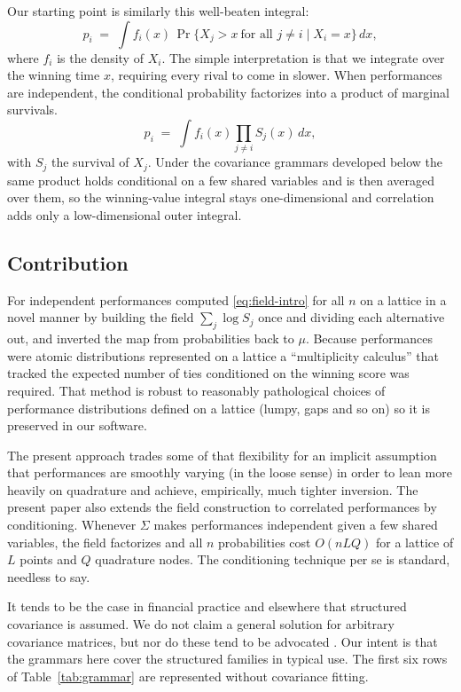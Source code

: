\documentclass[11pt]{article}
\begin{document}
Our starting point is similarly this well-beaten integral:
\begin{equation}\label{eq:onedim}
p_i \;=\; \int f_i(x)\,
\Pr\{X_j>x\ \text{for all } j\ne i\mid X_i=x\}\,dx,
\end{equation}
where $f_i$ is the density of $X_i$. The simple interpretation is that we integrate over the winning time $x$,
requiring every rival to come in slower. When performances are
independent, the conditional probability factorizes into a product of
marginal survivals.
\begin{equation}\label{eq:field-intro}
p_i \;=\; \int f_i(x)\prod_{j\ne i}S_j(x)\,dx,
\end{equation}
with $S_j$ the survival of $X_j$. Under the covariance grammars developed
below the same product holds conditional on a few shared variables and is
then averaged over them, so the winning-value integral stays
one-dimensional and correlation adds only a low-dimensional outer
integral.

\subsection{Contribution}

For independent performances \citet{cotton2021} computed \eqref{eq:field-intro} for
all $n$ on a lattice in a novel manner by building the field $\sum_j \log S_j$ once and dividing
each alternative out, and inverted the map from probabilities back to $\mu$. Because performances were atomic distributions represented on a lattice a ``multiplicity calculus'' that tracked the expected number of ties conditioned on the winning score was required. That method is robust to reasonably pathological choices of performance distributions defined on a lattice (lumpy, gaps and so on) so it is preserved in our software.

The present approach trades some of that flexibility for an implicit assumption that performances are smoothly varying (in the loose sense) in order to lean more heavily on quadrature and achieve, empirically, much tighter inversion. The
present paper also extends the field construction to correlated performances by
conditioning. Whenever $\Sigma$ makes performances independent given a few shared variables, the field factorizes and all $n$ probabilities cost $O(nLQ)$ for a lattice of $L$ points and $Q$ quadrature nodes. The conditioning technique per se is standard, needless to say.

It tends to be the case in financial practice and elsewhere that structured covariance is assumed. We do not claim a general solution for arbitrary covariance matrices, but nor do these tend to be advocated \citep{train2009}. Our intent is that the grammars here cover the structured families in typical use. The first six rows of Table~\ref{tab:grammar} are represented without covariance fitting.
\end{document}
